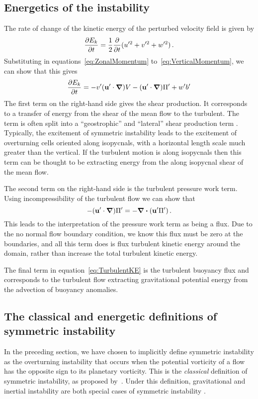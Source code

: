     \subsection{Energetics of the instability}
    The rate of change of the kinetic energy of the perturbed velocity field is given by
    \begin{equation}
        \label{eq:TurbulentKE}
        \pdv{E_k}{t} = \frac{1}{2}\frac{\partial}{\partial t} (u'^2 + v'^2 + w'^2) \, .
    \end{equation}
    Substituting in equations~\ref{eq:ZonalMomentum} to~\ref{eq:VerticalMomentum}, we can show that this gives
    \begin{equation}
        \pdv{E_k}{t} = - v' (\mathbf{u}'\cdot \grad) V - (\mathbf{u}'\cdot \grad) \Pi ' + w' b' 
    \end{equation}
    The first term on the right-hand side gives the shear production. It corresponds to a transfer of energy from the shear of the mean flow to the turbulent. The term is often split into a ``geostrophic'' and ``lateral'' shear production term \citep{Haine1998, Thomas2013}. Typically, the excitement of symmetric instability leads to the excitement of overturning cells oriented along isopycnals, with a horizontal length scale much greater than the vertical. If the turbulent motion is along isopycnals then this term can be thought to be extracting energy from the along isopycnal shear of the mean flow.
    
    The second term on the right-hand side is the turbulent pressure work term. Using incompressibility of the turbulent flow we can show that
    \begin{equation}
       - (\mathbf{u}'\cdot \grad) \Pi ' = - \div{(\mathbf{u'}\Pi ')} \, .
    \end{equation}
    This leads to the interpretation of the pressure work term as being a flux. Due to the no normal flow boundary condition, we know this flux must be zero at the boundaries, and all this term does is flux turbulent kinetic energy around the domain, rather than increase the total turbulent kinetic energy.
    
    The final term in equation~\ref{eq:TurbulentKE} is the turbulent buoyancy flux and corresponds to the turbulent flow extracting gravitational potential energy from the advection of buoyancy anomalies.

    \subsection{The classical and energetic definitions of symmetric instability}
    In the preceding section, we have chosen to implicitly define symmetric instability as the overturning instability that occurs when the potential vorticity of a flow has the opposite sign to its planetary vorticity. This is the \textit{classical} definition of symmetric instability, as proposed by~\citet{Hoskins1974}. Under this definition, gravitational and inertial instability are both special cases of symmetric instability \citep{Xu1985}. 
    
